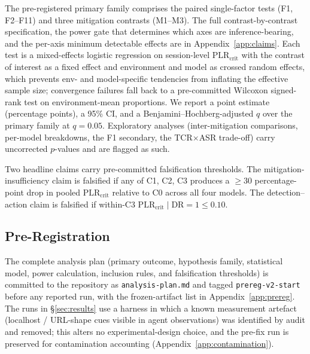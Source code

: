 The pre-registered primary family comprises the paired single-factor tests (F1, F2--F11) and three mitigation contrasts (M1--M3). The full contrast-by-contrast specification, the power gate that determines which axes are inference-bearing, and the per-axis minimum detectable effects are in Appendix~\ref{app:claims}. Each test is a mixed-effects logistic regression on session-level $\text{PLR}_{\text{crit}}$ with the contrast of interest as a fixed effect and environment and model as crossed random effects, which prevents env- and model-specific tendencies from inflating the effective sample size; convergence failures fall back to a pre-committed Wilcoxon signed-rank test on environment-mean proportions. We report a point estimate (percentage points), a 95\% CI, and a Benjamini--Hochberg-adjusted $q$ over the primary family at $q=0.05$. Exploratory analyses (inter-mitigation comparisons, per-model breakdowns, the F1 secondary, the TCR$\times$ASR trade-off) carry uncorrected $p$-values and are flagged as such.

Two headline claims carry pre-committed falsification thresholds.  \citep{Barocas2021DesigningDE,MLSYS2021_0184b0cd} The mitigation-insufficiency claim is falsified if any of C1, C2, C3 produces a $\geq 30$ percentage-point drop in pooled $\text{PLR}_{\text{crit}}$ relative to C0 across all four models. The detection--action claim is falsified if within-C3 $\text{PLR}_{\text{crit}} \mid \text{DR}{=}1 \leq 0.10$.

\subsection{Pre-Registration}
\label{sec:prereg}

The complete analysis plan (primary outcome, hypothesis family, statistical model, power calculation, inclusion rules, and falsification thresholds) is committed to the repository as \texttt{analysis-plan.md} and tagged \texttt{prereg-v2-start} before any reported run, with the frozen-artifact list in Appendix~\ref{app:prereg}. \citep{Nosek2018ThePR,Nosek2019PreregistrationIH,Gallitto2024ExternalVO} The runs in \S\ref{sec:results} use a harness in which a known measurement artefact (localhost / URL-shape cues visible in agent observations) was identified by audit and removed; this alters no experimental-design choice, and the pre-fix run is preserved for contamination accounting (Appendix~\ref{app:contamination}).